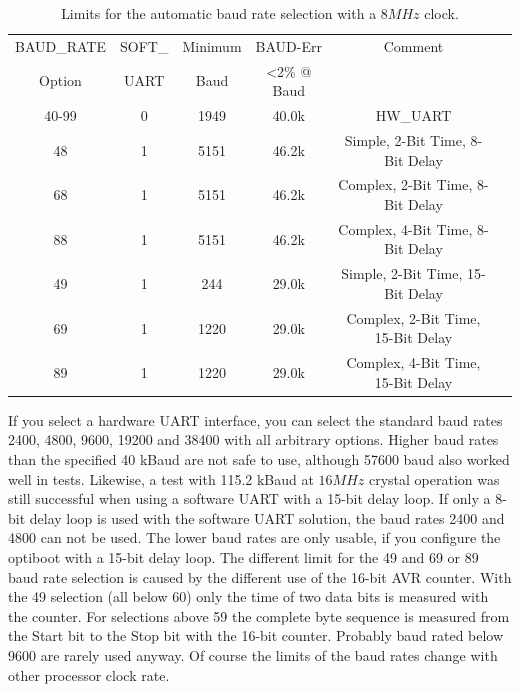\begin{table}[H]
  \begin{center}
    \begin{tabular}{| c | c | c | c | c | c |}
    \hline
   BAUD\_RATE  & SOFT\_ & Minimum & BAUD-Err & Comment  \\
   Option      & UART   & Baud    & \textless 2\% @ Baud &  \\
    \hline
    \hline
    40-99      &  0     &  1949       &   40.0k  & HW\_UART  \\
    \hline
    48         &  1     &  5151       &   46.2k  & Simple, 2-Bit Time, 8-Bit Delay  \\
    \hline
    68         &  1     &  5151       &   46.2k  & Complex, 2-Bit Time, 8-Bit Delay  \\
    \hline
    88         &  1     &  5151       &   46.2k  & Complex, 4-Bit Time, 8-Bit Delay  \\
    \hline
    49         &  1     &  244       &   29.0k  &  Simple, 2-Bit Time, 15-Bit Delay\\
    \hline
    69         &  1     &  1220       &   29.0k &  Complex, 2-Bit Time, 15-Bit Delay \\
    \hline
    89         &  1     &  1220       &   29.0k & Complex, 4-Bit Time, 15-Bit Delay \\
    \hline
    \end{tabular}
  \end{center}
  \caption{Limits for the automatic baud rate selection with a \(8MHz\) clock.}
  \label{tab:AutoBaud8}
\end{table}

If you select a hardware UART interface, you can select the standard
baud rates 2400, 4800, 9600, 19200 and 38400 with all arbitrary options.
Higher baud rates than the specified 40 kBaud are not safe to use,
although 57600 baud also worked well in tests.
Likewise, a test with 115.2 kBaud at \(16MHz\) crystal operation was still successful
when using a software UART with a 15-bit delay loop.
If only a 8-bit delay loop is used with the software UART solution,
the baud rates 2400 and 4800 can not be used.
The lower baud rates are only usable, if you configure the optiboot
with a 15-bit delay loop.
The different limit for the 49 and 69 or 89 baud rate selection is caused
by the different use of the 16-bit AVR counter.
With the 49 selection (all below 60) only the time of two data bits is measured
with the counter. For selections above 59 the complete byte sequence is
measured from the Start bit to the Stop bit with the 16-bit counter.
Probably baud rated below 9600 are rarely used anyway.
Of course the limits of the baud rates change with other processor clock rate.

